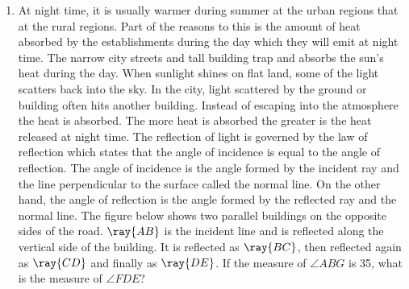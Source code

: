 \begin{enumerate}
\item At night time, it is usually warmer during summer at the urban regions that at the rural regions. Part
of the reasons to this is the amount of heat absorbed by the establishments during the day which
they will emit at night time. The narrow city streets and tall building trap and absorbs the sun's heat
during the day. When sunlight shines on flat land, some of the light scatters back into the sky. In
the city, light scattered by the ground or building often hits another building. Instead of escaping
into the atmosphere the heat is absorbed. The more heat is absorbed the greater is the heat
released at night time. The reflection of light is governed by the law of reflection which states that
the angle of incidence is equal to the angle of reflection. The angle of incidence is the angle formed
by the incident ray and the line perpendicular to the surface called the normal line. On the other
hand, the angle of reflection is the angle formed by the reflected ray and the normal line. The figure
below shows two parallel buildings on the opposite sides of the road. $\ray{AB}$ is the incident line and is reflected along the vertical side of the building. It is reflected as $\ray{BC}$, then reflected again as $\ray{CD}$ and finally as $\ray{DE}$. If the measure of $\angle ABG$ is 35, what is the measure of $\angle FDE$?
\begin{center}
\end{center}
\Solution


\end{enumerate}
